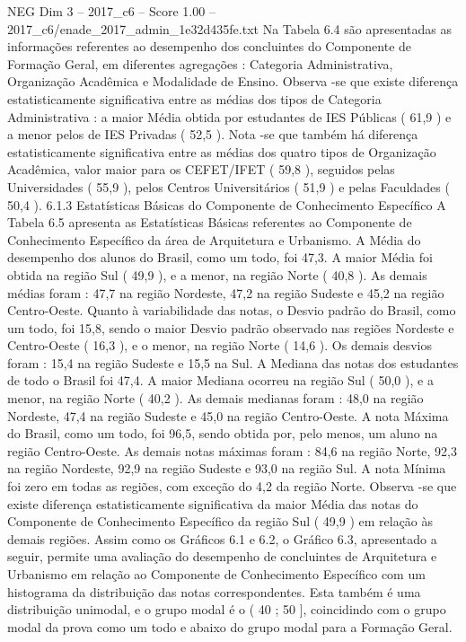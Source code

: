\begin{textsample}{NEG Dim 3 – 2017\_c6 – Score 1.00 – 2017\_c6/enade\_2017\_admin\_1e32d435fe.txt}
Na Tabela 6.4 são apresentadas as informações referentes ao desempenho dos concluintes do Componente de Formação Geral, em diferentes agregações : Categoria Administrativa, Organização Acadêmica e Modalidade de Ensino.
Observa -se que existe diferença estatisticamente significativa entre as médias dos tipos de Categoria Administrativa : a maior Média obtida por estudantes de IES Públicas ( 61,9 ) e a menor pelos de IES Privadas ( 52,5 ).
Nota -se que também há diferença estatisticamente significativa entre as médias dos quatro tipos de Organização Acadêmica, valor maior para os CEFET/IFET ( 59,8 ), seguidos pelas Universidades ( 55,9 ), pelos Centros Universitários ( 51,9 ) e pelas Faculdades ( 50,4 ). 6.1.3 Estatísticas Básicas do Componente de Conhecimento Específico A Tabela 6.5 apresenta as Estatísticas Básicas referentes ao Componente de Conhecimento Específico da área de Arquitetura e Urbanismo.
A Média do desempenho dos alunos do Brasil, como um todo, foi 47,3.
A maior Média foi obtida na região Sul ( 49,9 ), e a menor, na região Norte ( 40,8 ).
As demais médias foram : 47,7 na região Nordeste, 47,2 na região Sudeste e 45,2 na região Centro-Oeste.
Quanto à variabilidade das notas, o Desvio padrão do Brasil, como um todo, foi 15,8, sendo o maior Desvio padrão observado nas regiões Nordeste e Centro-Oeste ( 16,3 ), e o menor, na região Norte ( 14,6 ).
Os demais desvios foram : 15,4 na região Sudeste e 15,5 na Sul.
A Mediana das notas dos estudantes de todo o Brasil foi 47,4.
A maior Mediana ocorreu na região Sul ( 50,0 ), e a menor, na região Norte ( 40,2 ).
As demais medianas foram : 48,0 na região Nordeste, 47,4 na região Sudeste e 45,0 na região Centro-Oeste.
A nota Máxima do Brasil, como um todo, foi 96,5, sendo obtida por, pelo menos, um aluno na região Centro-Oeste.
As demais notas máximas foram : 84,6 na região Norte, 92,3 na região Nordeste, 92,9 na região Sudeste e 93,0 na região Sul.
A nota Mínima foi zero em todas as regiões, com exceção do 4,2 da região Norte.
Observa -se que existe diferença estatisticamente significativa da maior Média das notas do Componente de Conhecimento Específico da região Sul ( 49,9 ) em relação às demais regiões.
Assim como os Gráficos 6.1 e 6.2, o Gráfico 6.3, apresentado a seguir, permite uma avaliação do desempenho de concluintes de Arquitetura e Urbanismo em relação ao Componente de Conhecimento Específico com um histograma da distribuição das notas correspondentes.
Esta também é uma distribuição unimodal, e o grupo modal é o ( 40 ; 50 ], coincidindo com o grupo modal da prova como um todo e abaixo do grupo modal para a Formação Geral.

\end{textsample}
